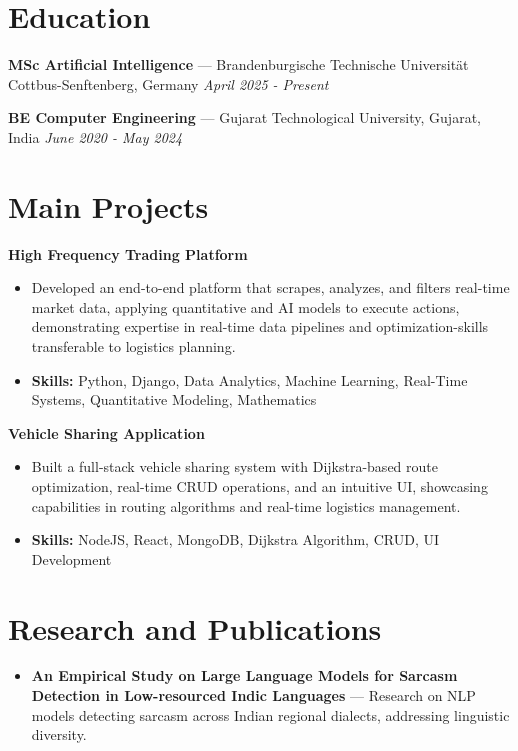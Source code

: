 \documentclass[a4paper,10pt]{article}
\begin{document}
\section*{Education}
\textbf{MSc Artificial Intelligence} — Brandenburgische Technische Universität Cottbus-Senftenberg, Germany \hfill \textit{April 2025 - Present}\par
\vspace{1.5pt}
\textbf{BE Computer Engineering} — Gujarat Technological University, Gujarat, India \hfill \textit{June 2020 - May 2024}\par

\section*{Main Projects}
\textbf{High Frequency Trading Platform}\par
\vspace{1pt}
\begin{itemize}
  \item Developed an end-to-end platform that scrapes, analyzes, and filters real-time market data, applying quantitative and AI models to execute actions, demonstrating expertise in real-time data pipelines and optimization-skills transferable to logistics planning.
  \item \textbf{Skills:} Python, Django, Data Analytics, Machine Learning, Real-Time Systems, Quantitative Modeling, Mathematics
\end{itemize}
\vspace{3pt}
\textbf{Vehicle Sharing Application}\par
\vspace{1pt}
\begin{itemize}
  \item Built a full-stack vehicle sharing system with Dijkstra-based route optimization, real-time CRUD operations, and an intuitive UI, showcasing capabilities in routing algorithms and real-time logistics management.
  \item \textbf{Skills:} NodeJS, React, MongoDB, Dijkstra Algorithm, CRUD, UI Development
\end{itemize}

\section*{Research and Publications}
\begin{itemize}
\item \textbf{An Empirical Study on Large Language Models for Sarcasm Detection in Low-resourced Indic Languages} — Research on NLP models detecting sarcasm across Indian regional dialects, addressing linguistic diversity.
\end{itemize}
\end{document}
